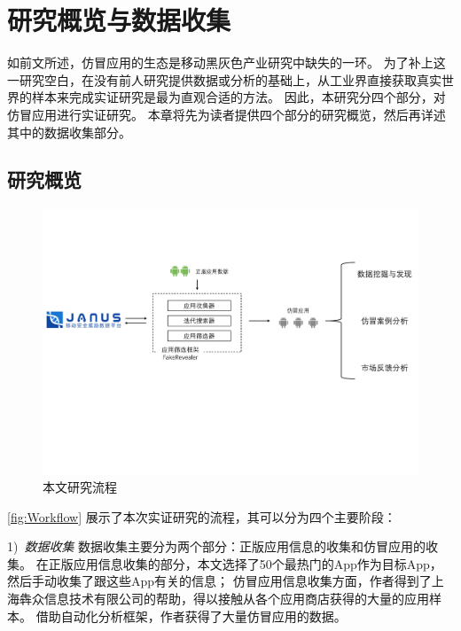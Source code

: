 \chapter{研究概览与数据收集}
\label{chp:dataCollection}

如前文所述，仿冒应用的生态是移动黑灰色产业研究中缺失的一环。
为了补上这一研究空白，在没有前人研究提供数据或分析的基础上，从工业界直接获取真实世界的样本来完成实证研究是最为直观合适的方法。
因此，本研究分四个部分，对仿冒应用进行实证研究。
本章将先为读者提供四个部分的研究概览，然后再详述其中的数据收集部分。

\section{研究概览}

\begin{figure}[htbp]
	\centering
	\includegraphics[width=\textwidth]{./Figures/edwin-overview}
	\caption{本文研究流程}
	\label{fig:Workflow}
	\vspace{-3mm}
\end{figure}

\autoref{fig:Workflow} 展示了本次实证研究的流程，其可以分为四个主要阶段：

1)\ \emph{数据收集} \quad
数据收集主要分为两个部分：正版应用信息的收集和仿冒应用的收集。
在正版应用信息收集的部分，本文选择了50个最热门的App作为目标App，然后手动收集了跟这些App有关的信息；
仿冒应用信息收集方面，作者得到了上海犇众信息技术有限公司的帮助，得以接触从各个应用商店获得的大量的应用样本。
借助自动化分析框架\mytool，作者获得了大量仿冒应用的数据。

